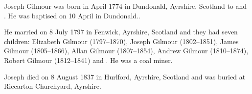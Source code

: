 
Joseph Gilmour was born in April 1774 in Dundonald, Ayrshire, Scotland
to  and .
He was baptised on 10 April in Dundonald.\cite{JosephGilmourBirth}.

He married  on 8 July 1797 in Fenwick, Ayrshire, Scotland and they had seven children:
Elizabeth Gilmour (1797--1870), Joseph Gilmour (1802--1851), James Gilmour (1805--1866), Allan Gilmour (1807--1854),
Andrew Gilmour (1810--1874), Robert Gilmour (1812--1841) and .
He was a coal miner.

Joseph died on 8 August 1837 in Hurlford, Ayrshire, Scotland and was buried at Riccarton Churchyard, Ayrshire.\cite{JosephGilmourDeath}
